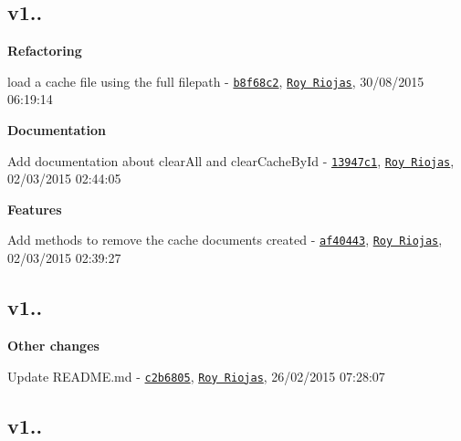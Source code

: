 \subsection*{v1..}


\begin{DoxyItemize}
\item {\bfseries Refactoring}
\begin{DoxyItemize}
\item load a cache file using the full filepath -\/ \href{https://github.com/royriojas/flat-cache/commit/b8f68c2}{\tt b8f68c2}, \href{https://github.com/Roy Riojas}{\tt Roy Riojas}, 30/08/2015 06\+:19\+:14
\end{DoxyItemize}
\item {\bfseries Documentation}
\begin{DoxyItemize}
\item Add documentation about {\ttfamily clear\+All} and {\ttfamily clear\+Cache\+By\+Id} -\/ \href{https://github.com/royriojas/flat-cache/commit/13947c1}{\tt 13947c1}, \href{https://github.com/Roy Riojas}{\tt Roy Riojas}, 02/03/2015 02\+:44\+:05
\end{DoxyItemize}
\item {\bfseries Features}
\begin{DoxyItemize}
\item Add methods to remove the cache documents created -\/ \href{https://github.com/royriojas/flat-cache/commit/af40443}{\tt af40443}, \href{https://github.com/Roy Riojas}{\tt Roy Riojas}, 02/03/2015 02\+:39\+:27
\end{DoxyItemize}
\end{DoxyItemize}

\subsection*{v1..}


\begin{DoxyItemize}
\item {\bfseries Other changes}
\begin{DoxyItemize}
\item Update R\+E\+A\+D\+M\+E.\+md -\/ \href{https://github.com/royriojas/flat-cache/commit/c2b6805}{\tt c2b6805}, \href{https://github.com/Roy Riojas}{\tt Roy Riojas}, 26/02/2015 07\+:28\+:07
\end{DoxyItemize}
\end{DoxyItemize}

\subsection*{v1..}


